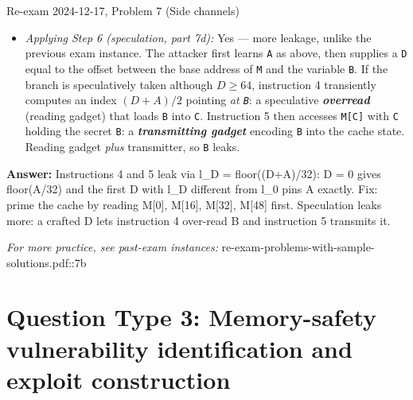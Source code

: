 \documentclass[12pt, a4paper]{article}
\newcommand{\term}[1]{\textbf{\textit{#1}}}        %
\begin{document}
\begin{practicebox}{Re-exam 2024-12-17, Problem 7 (Side channels)}
\begin{itemize}
    \item \textit{Applying Step 6 (speculation, part 7d):} Yes --- more leakage, unlike the previous exam instance. The attacker first learns \texttt{A} as above, then supplies a \texttt{D} equal to the offset between the base address of \texttt{M} and the variable \texttt{B}. If the branch is speculatively taken although $D \geq 64$, instruction 4 transiently computes an index $(D + A)/2$ pointing \emph{at \texttt{B}}: a speculative \term{overread} (reading gadget) that loads \texttt{B} into \texttt{C}. Instruction 5 then accesses \texttt{M[C]} with \texttt{C} holding the secret \texttt{B}: a \term{transmitting gadget} encoding \texttt{B} into the cache state. Reading gadget \emph{plus} transmitter, so \texttt{B} leaks.
\end{itemize}
\textbf{Answer:} Instructions 4 and 5 leak via l\_D = floor((D+A)/32): D = 0 gives floor(A/32) and the first D with l\_D different from l\_0 pins A exactly. Fix: prime the cache by reading M[0], M[16], M[32], M[48] first. Speculation leaks more: a crafted D lets instruction 4 over-read B and instruction 5 transmits it.
\end{practicebox}

\textit{For more practice, see past-exam instances:} re-exam-problems-with-sample-solutions.pdf::7b

\section{Question Type 3: Memory-safety vulnerability identification and exploit construction}
\end{document}
